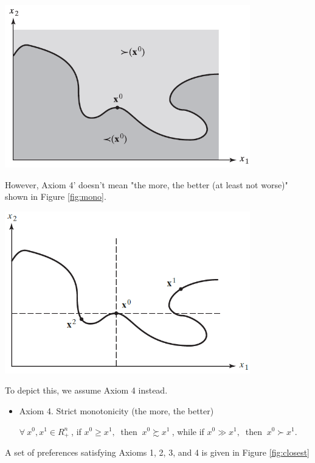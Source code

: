 \documentclass{article}
\begin{document}
\begin{mdframed}[backgroundcolor=blue!20,linecolor=white]
{\centering
\includegraphics[width=0.8\textwidth]{1.line}
\label{fig:line}}
\vspace{2mm}

However, Axiom 4' doesn't mean "the more, the better (at least not worse)" shown in Figure \ref{fig:mono}.
\vspace{2mm}

{\centering
\includegraphics[width=0.8\textwidth]{1.mono}
\label{fig:mono}}
\vspace{2mm}

To depict this, we assume Axiom 4 instead.

\begin{itemize}
\item Axiom 4. Strict monotonicity (the more, the better)

$\forall \ x^0, x^1 \in R^n_+ \ $, if $x^0 \ge x^1, \ $ then  $\ x^0 \succsim x^1 \ $, while if 
$x^0 \gg x^1, \ $ then  $\ x^0 \succ x^1$.
\end{itemize}

A set of preferences satisfying Axioms 1, 2, 3, and 4 is given in Figure \ref{fig:closest}
\vspace{2mm}


\end{mdframed}
\end{document}
